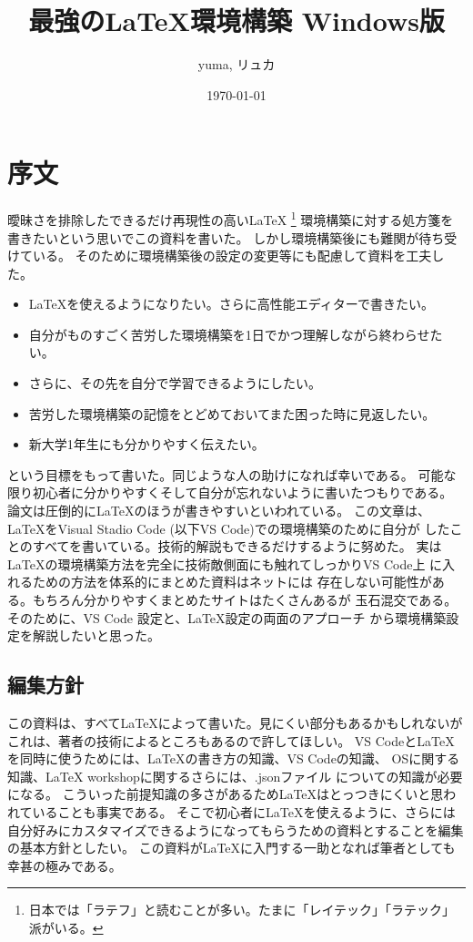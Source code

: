 \documentclass{ltjsarticle}
\begin{document}
\title{最強の\LaTeX 環境構築 Windows版}
\author{yuma, リュカ}
\date{\today}
\maketitle
\section{序文}
曖昧さを排除したできるだけ再現性の高い\LaTeX 
\footnote{日本では「ラテフ」と読むことが多い。たまに「レイテック」「ラテック」派がいる。}
環境構築に対する処方箋を書きたいという思いでこの資料を書いた。
しかし環境構築後にも難関が待ち受けている。
そのために環境構築後の設定の変更等にも配慮して資料を工夫した。
\begin{itemize}
  \item \LaTeX を使えるようになりたい。さらに高性能エディターで書きたい。
  \item 自分がものすごく苦労した環境構築を1日でかつ理解しながら終わらせたい。
  \item さらに、その先を自分で学習できるようにしたい。
  \item 苦労した環境構築の記憶をとどめておいてまた困った時に見返したい。
  \item 新大学1年生にも分かりやすく伝えたい。
\end{itemize}
という目標をもって書いた。同じような人の助けになれば幸いである。
可能な限り初心者に分かりやすくそして自分が忘れないように書いたつもりである。
論文は圧倒的に\LaTeX のほうが書きやすいといわれている。
この文章は、\LaTeX をVisual Stadio Code (以下VS Code)での環境構築のために自分が
したことのすべてを書いている。技術的解説もできるだけするように努めた。
実は\LaTeX の環境構築方法を完全に技術敵側面にも触れてしっかりVS Code上
に入れるための方法を体系的にまとめた資料はネットには
存在しない可能性がある。もちろん分かりやすくまとめたサイトはたくさんあるが
玉石混交である。そのために、VS Code 設定と、\LaTeX 設定の両面のアプローチ
から環境構築設定を解説したいと思った。


\subsection{編集方針}

この資料は、すべて\LaTeX によって書いた。見にくい部分もあるかもしれないが
これは、著者の技術によるところもあるので許してほしい。
VS Codeと\LaTeX を同時に使うためには、\LaTeX の書き方の知識、VS Codeの知識、
OSに関する知識、LaTeX workshopに関するさらには、.jsonファイル
についての知識が必要になる。
こういった前提知識の多さがあるため\LaTeX はとっつきにくいと思われていることも事実である。
そこで初心者に\LaTeX を使えるように、さらには自分好みにカスタマイズできるようになってもらうための資料とすることを編集の基本方針としたい。
この資料が\LaTeX に入門する一助となれば筆者としても幸甚の極みである。
\end{document}
